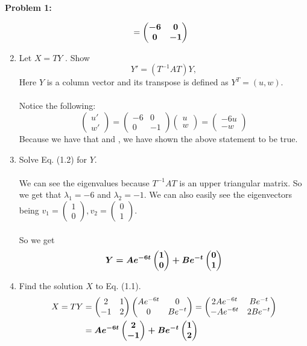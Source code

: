 \documentclass[11pt]{article}
\newcommand{\cvec}[2]{\begin{pmatrix} #1 \\ #2 \end{pmatrix}}
\newcommand{\smat}[4]{\begin{pmatrix} #1 & #2 \\ #3 & #4 \end{pmatrix}}
\newcommand{\bmath}[1]{\text{\boldmath#1\unboldmath}}
\newcommand{\skipline}{\vspace{\baselineskip}}
\newenvironment{problem}[1]{\textbf{Problem #1: }}{\newpage}
\begin{document}
\begin{problem}{1}
\begin{enumerate}[label = (\alph*)]
\begin{align*}
				&= \bmath{$\smat{-6}{0}{0}{-1}$}
			\end{align*}
			\newpage
			\item Let $X = T Y$ . Show
			\[Y' = (T^{-1}AT)Y,\tag{1.2}\]
			Here $Y$ is a column vector and its transpose is defined as $Y^T = (u, w)$. 
			\\ \\
			Notice the following:
			\[\cvec{u'}{w'} = \smat{-6}{0}{0}{-1} \cvec{u}{w} = \cvec{-6u}{-w}\]
			Because we have that \bmath{$u' = \lambda_1 u $} and \bmath{$w' =\lambda_2 w$}, we have shown the above statement to be true.
			\skipline
			\item Solve Eq. (1.2) for $Y$.
			\\ \\
			We can see the eigenvalues because $T^{-1}AT$ is an upper triangular matrix. So we get that $\lambda_1 = -6$ and $\lambda_2 = -1$.  We can also easily see the eigenvectors being $v_1 = \cvec{1}{0}, v_2 = \cvec{0}{1}$.
			\\ \\
			So we get
			\[\bmath{$Y = Ae^{-6t}\cvec{1}{0} + Be^{-t}\cvec{0}{1}$}\]
			\item Find the solution $X$ to Eq. (1.1).
			\begin{align*} 
				X = TY &= \smat{2}{1}{-1}{2}\smat{Ae^{-6t}}{0}{0}{Be^{-t}} = \smat{2Ae^{-6t}}{Be^{-t}}{-Ae^{-6t}}{2Be^{-t}} \\
				&= \bmath{$Ae^{-6t}\cvec{2}{-1} + Be^{-t}\cvec{1}{2}$}
			\end{align*}
		\end{enumerate}
	\end{problem}
\end{document}
